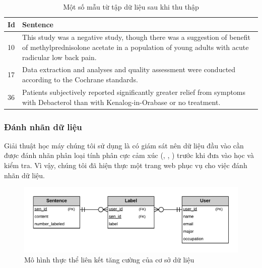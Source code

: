 \begin{table}[H]
\centering
\begin{minipage}{1.0\textwidth}
\caption{Một số mẫu từ tập dữ liệu sau khi thu thập} \label{table:data}
\begin{tabular}{|l| m{} | } 
\hline
\textbf{Id} & \textbf{Sentence} \\ \hline
10 & This study was a negative study, though there was a suggestion of benefit of methylprednisolone acetate in a population of young adults with acute radicular low back pain. \\ \hline
17 & Data extraction and analyses and quality assessment were conducted according to the Cochrane standards. \\ \hline
36 & Patients subjectively reported significantly greater relief from symptoms with Debacterol than with Kenalog-in-Orabase or no treatment. \\ \hline
\end{tabular}
\end{minipage}
\end{table}

\subsubsection*{Đánh nhãn dữ liệu}
Giải thuật học máy chúng tôi sử dụng là có giám sát nên dữ liệu đầu vào cần được đánh nhãn phân loại tính phân cực cảm xúc (\tichcuc, \tieucuc, \trungtinh) trước khi đưa vào học và kiểm tra. Vì vậy, chúng tôi đã hiện thực một trang web phục vụ cho việc đánh nhãn dữ liệu.\\

\begin{figure}[h]
\centering
\includegraphics[scale=0.25]{../hinh/EERD.png}
\caption{Mô hình thực thể liên kết tăng cường của cơ sở dữ liệu}
\label{fig:SQL}
\end{figure}

